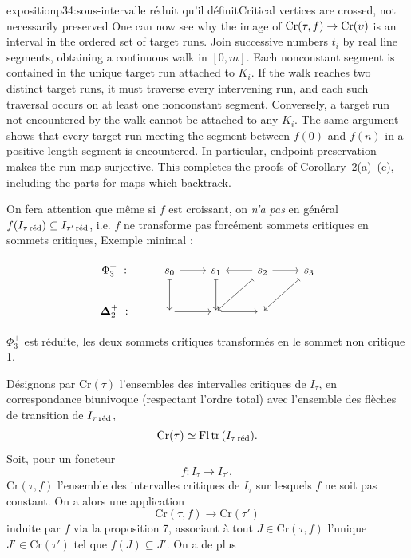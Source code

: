 \begin{dcomment}{exposition}{p34:sous-intervalle réduit qu'il définit}{Critical vertices are crossed, not necessarily preserved}
One can now see why the image of $\Cr(\tau,f)\to\Cr(\upsilon)$ is an interval in the ordered set of target runs. Join successive numbers $t_i$ by real line segments, obtaining a continuous walk in $[0,m]$. Each nonconstant segment is contained in the unique target run attached to $K_i$. If the walk reaches two distinct target runs, it must traverse every intervening run, and each such traversal occurs on at least one nonconstant segment. Conversely, a target run not encountered by the walk cannot be attached to any $K_i$. The same argument shows that every target run meeting the segment between $f(0)$ and $f(n)$ in a positive-length segment is encountered. In particular, endpoint preservation makes the run map surjective. This completes the proofs of Corollary~2(a)--(c), including the parts for maps which backtrack.
\end{dcomment}


On fera attention que même si $f$ est croissant, on \textit{n'a pas} en général $f(I_{\tau\,\red})\subseteq I_{\tau'\,\red}$, i.e. $f$ ne transforme pas forcément sommets critiques en sommets critiques, Exemple minimal :

\noindent
\begin{minipage}[c]{0.6\textwidth}
\[
\begin{tikzcd}
\Phi_3^+\ : & s_0 \arrow[r] \arrow[d, mapsto] & s_1 \arrow[d, mapsto] & s_2 \arrow[l] \arrow[r] \arrow[dl, mapsto] & s_3 \arrow[dl, mapsto] \\
\bDelta_2^+\ : & {} \arrow[r] & {} \arrow[r] & {} &
\end{tikzcd}
\]
\end{minipage}\hfill
\begin{minipage}[c]{0.35\textwidth}
$\Phi_3^+$ est réduite, les deux sommets critiques transformés en le sommet non critique 1.
\end{minipage}

Désignons par $\mathrm{Cr}(\tau)$ l'ensembles des intervalles critiques de $I_\tau$, en correspondance biunivoque (respectant l'ordre total) avec l'ensemble des flèches de transition de $I_{\tau\,\red}$, %
\[
\mathrm{Cr}(\tau)\simeq\mathrm{Fl}\,\mathrm{tr}\,(I_{\tau\,\red}).
\]
Soit, pour un foncteur
\[
f : I_\tau\longrightarrow I_{\tau'},
\]
$\mathrm{Cr}(\tau,f)$ l'ensemble des intervalles critiques de $I_\tau$ sur lesquels $f$ ne soit pas constant. On a alors une application
\[
\mathrm{Cr}(\tau,f)\longrightarrow\mathrm{Cr}(\tau') \tag*{$(*)$} %
\]
induite par $f$ via la proposition 7, associant à tout $J\in\mathrm{Cr}(\tau,f)$ l'unique $J'\in\mathrm{Cr}(\tau')$ tel que $f(J)\subseteq J'$. On a de plus

